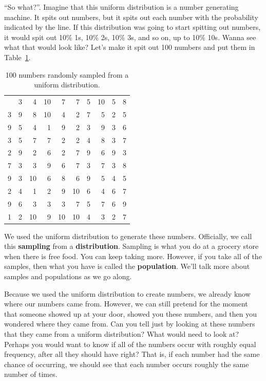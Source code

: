 \documentclass[
  letterpaper,
  DIV=11,
  numbers=noendperiod]{scrreprt}
\begin{document}
``So what?''. Imagine that this uniform distribution is a number
generating machine. It spits out numbers, but it spits out each number
with the probability indicated by the line. If this distribution was
going to start spitting out numbers, it would spit out 10\% 1s, 10\% 2s,
10\% 3s, and so on, up to 10\% 10s. Wanna see what that would look like?
Let's make it spit out 100 numbers and put them in
Table~\ref{tbl-5100rand}.

\begin{longtable}[]{@{}rrrrrrrrrr@{}}

\caption{\label{tbl-5100rand}100 numbers randomly sampled from a uniform
distribution.}

\tabularnewline

\toprule\noalign{}
\endhead
\bottomrule\noalign{}
\endlastfoot
9 & 3 & 4 & 10 & 7 & 7 & 5 & 10 & 5 & 8 \\
3 & 9 & 8 & 10 & 4 & 2 & 7 & 5 & 2 & 5 \\
9 & 5 & 4 & 1 & 9 & 2 & 3 & 9 & 3 & 6 \\
3 & 5 & 7 & 7 & 2 & 2 & 4 & 8 & 3 & 7 \\
2 & 9 & 2 & 6 & 2 & 7 & 9 & 6 & 9 & 3 \\
7 & 3 & 3 & 9 & 6 & 7 & 3 & 7 & 3 & 8 \\
9 & 3 & 10 & 6 & 8 & 6 & 9 & 5 & 4 & 5 \\
2 & 4 & 1 & 2 & 9 & 10 & 6 & 4 & 6 & 7 \\
9 & 6 & 3 & 3 & 3 & 7 & 5 & 7 & 6 & 9 \\
1 & 2 & 10 & 9 & 10 & 10 & 4 & 3 & 2 & 7 \\

\end{longtable}

We used the uniform distribution to generate these numbers. Officially,
we call this \textbf{sampling} from a \textbf{distribution}. Sampling is
what you do at a grocery store when there is free food. You can keep
taking more. However, if you take all of the samples, then what you have
is called the \textbf{population}. We'll talk more about samples and
populations as we go along.

Because we used the uniform distribution to create numbers, we already
know where our numbers came from. However, we can still pretend for the
moment that someone showed up at your door, showed you these numbers,
and then you wondered where they came from. Can you tell just by looking
at these numbers that they came from a uniform distribution? What would
need to look at? Perhaps you would want to know if all of the numbers
occur with roughly equal frequency, after all they should have right?
That is, if each number had the same chance of occurring, we should see
that each number occurs roughly the same number of times.
\end{document}
